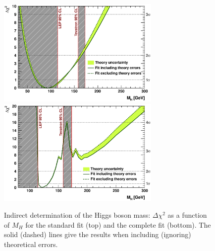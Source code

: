 \begin{figure}[htb]
\centering
\includegraphics[width=0.7\textwidth]{StandardModel/HiggsScan.eps}
\includegraphics[width=0.7\textwidth]{StandardModel/HiggsScanDirectSearches.eps}
\caption{\small Indirect determination of the Higgs boson mass: 
            $\Delta\chi^2$ as a function of $M_H$ for the standard fit (top) and the 
            complete fit (bottom). The solid (dashed) lines give the results when 
            including (ignoring) theoretical errors.~\cite{Flacher:2008zq}
         }
\label{fig:indirect_greenband}
\end{figure}






%



